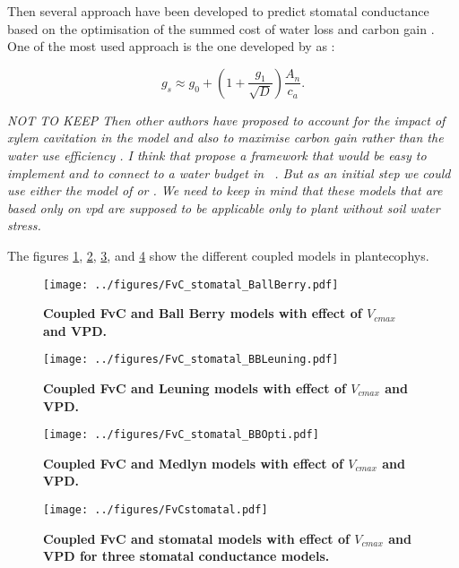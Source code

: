 \documentclass[a4paper,11pt]{article}
\begin{document}
Then several approach have been developed to predict stomatal conductance based on the optimisation of the summed cost of water loss and carbon gain \citep{Medlyn-2002,Prentice-2014,Wolf-2016,Sperry-2017}. One of the most used approach is the one developed by \citet{Medlyn-2011} as :

\begin{equation}
\label{eq:gs-Medlyn}
g_s \approx g_0 + (1 + \frac{g_1}{\sqrt{D}}) \frac{A_n }{c_a}.
\end{equation}


\textit{NOT TO KEEP Then other authors have proposed to account for the impact of xylem cavitation \citet{Wolf-2016,Sperry-2016,Sperry-2017} in the model and also to maximise carbon gain rather than the water use efficiency \citet{Wolf-2016}. I think that \citep{Sperry-2016} propose a framework that would be easy to implement and to connect to a water budget in \plant\ . But as an initial step we could use either the model of \citet{Medlyn-2011} or \citet{Leuning-1995}. We need to keep in mind that these models that are based only on vpd are supposed to be applicable only to plant without soil water stress.}

The figures \ref{fig:photo_stomat_BB}, \ref{fig:photo_stomat_Leuning}, \ref{fig:photo_stomat_opti}, and \ref{fig:photo_stomat} show the different coupled models in plantecophys.

\begin{figure}[ht]
\centering
\texttt{[image: ../figures/FvC\_stomatal\_BallBerry.pdf]}
\caption{\textbf{Coupled FvC and Ball Berry models with effect of $V_{cmax}$ and VPD.}
\label{fig:photo_stomat_BB}}
\end{figure}

\begin{figure}[ht]
\centering
\texttt{[image: ../figures/FvC\_stomatal\_BBLeuning.pdf]}
\caption{\textbf{Coupled FvC and Leuning models with effect of $V_{cmax}$ and VPD.}
\label{fig:photo_stomat_Leuning}}
\end{figure}

\begin{figure}[ht]
\centering
\texttt{[image: ../figures/FvC\_stomatal\_BBOpti.pdf]}
\caption{\textbf{Coupled FvC and Medlyn models with effect of $V_{cmax}$ and VPD.}
\label{fig:photo_stomat_opti}}
\end{figure}

\begin{figure}[ht]
\centering
\texttt{[image: ../figures/FvCstomatal.pdf]}
\caption{\textbf{Coupled FvC and stomatal models with effect of $V_{cmax}$ and VPD for three stomatal conductance models.}
\label{fig:photo_stomat}}
\end{figure}
\end{document}

